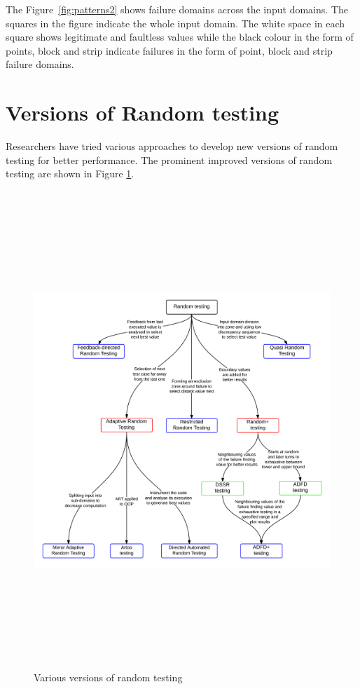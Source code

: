 
The Figure~\ref{fig:patterns2} shows failure domains across the input domains. The squares in the figure indicate the whole input domain. The white space in each square shows legitimate and faultless values while the black colour in the form of points, block and strip indicate failures in the form of point, block and strip failure domains.

\newpage
\section{Versions of Random testing} \label{sec:versionsOfRT}
Researchers have tried various approaches to develop new versions of random testing for better performance. The prominent improved versions of random testing are shown in Figure \ref{fig:randomTestingVersions_2}.

\begin{figure}[H]
	\centering
	\centerline{\includegraphics[width=16.5cm, height=18cm]{chapter2/randomTestingVariations.png}}
	\caption{Various versions of random testing}
	\label{fig:randomTestingVersions_2}
\end{figure}

